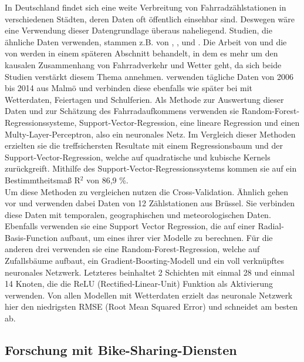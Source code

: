 \documentclass[a4paper,12pt]{thesis}
\begin{document}
In Deutschland findet sich eine weite Verbreitung von Fahrradzählstationen in verschiedenen Städten, deren Daten oft öffentlich einsehbar sind. Deswegen wäre eine Verwendung dieser Datengrundlage überaus naheliegend. Studien, die ähnliche Daten verwenden, stammen z.B. von \cite{Holmgren2017}, \cite{Broucke2019}, \cite{Wessel2020} und \cite{Goldmann2021}. Die Arbeit von \cite{Wessel2020} und die von \cite{Goldmann2021} werden in einem späteren Abschnitt behandelt, in dem es mehr um den kausalen Zusammenhang von Fahrradverkehr und Wetter geht, da sich beide Studien verstärkt diesem Thema annehmen. \cite{Holmgren2017} verwenden tägliche Daten von 2006 bis 2014 aus Malmö und verbinden diese ebenfalls wie später bei \cite{Wessel2020} mit Wetterdaten, Feiertagen und Schulferien. Als Methode zur Auswertung dieser Daten und zur Schätzung des Fahrradaufkommens verwenden sie Random-Forest-Regressionssysteme, Support-Vector-Regression, eine lineare Regression und einen Multy-Layer-Perceptron, also ein neuronales Netz. Im Vergleich dieser Methoden erzielten sie die treffsichersten Resultate mit einem Regressionsbaum und der Support-Vector-Regression, welche auf quadratische und kubische Kernels zurückgreift. Mithilfe des Support-Vector-Regressionssystems kommen sie auf ein Bestimmtheitsmaß R$^2$ von 86,9 \%.\\
Um diese Methoden zu vergleichen nutzen \cite{Holmgren2017} die Cross-Validation. Ähnlich gehen \cite{Broucke2019} vor und verwenden dabei Daten von 12 Zählstationen aus Brüssel. Sie verbinden diese Daten mit temporalen, geographischen und meteorologischen Daten. Ebenfalls verwenden sie eine Support Vector Regression, die auf einer Radial-Basis-Function aufbaut, um eines ihrer vier Modelle zu berechnen. Für die anderen drei verwenden sie eine Random-Forest-Regression, welche auf Zufallsbäume aufbaut, ein Gradient-Boosting-Modell und ein voll verknüpftes neuronales Netzwerk. Letzteres beinhaltet 2 Schichten mit einmal 28 und einmal 14 Knoten, die die ReLU (Rectified-Linear-Unit) Funktion als Aktivierung verwenden. Von allen Modellen mit Wetterdaten erzielt das neuronale Netzwerk hier den niedrigsten RMSE (Root Mean Squared Error) und schneidet am besten ab.

\subsection{Forschung mit Bike-Sharing-Diensten}
\end{document}
